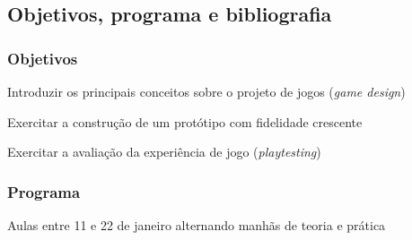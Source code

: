 \expandafter\documentclass\expandafter[table, usenames, svgnames, dvipsnames, \classopts]{beamer}
\begin{document}
\subsection{Objetivos, programa e bibliografia}

\begin{frame} 
	\frametitle{\textbf{Objetivos}}
	
	\begin{outline}[enumerate]
		\1 Introduzir os principais conceitos sobre o projeto de jogos (\textit{game design})
	    
		\vspace{1em}
	    
		\1 Exercitar a construção de um protótipo com fidelidade crescente
		
		\vspace{1em}
			    
		\1 Exercitar a avaliação da experiência de jogo (\textit{playtesting})
	\end{outline}
	
\end{frame}

\begin{frame} 
	\frametitle{\textbf{Programa}}
    
    \begin{outline}
        \1 Aulas entre 11 e 22 de janeiro
            \2[-] alternando manhãs de teoria e prática
    \end{outline}
\end{frame}
\end{document}
